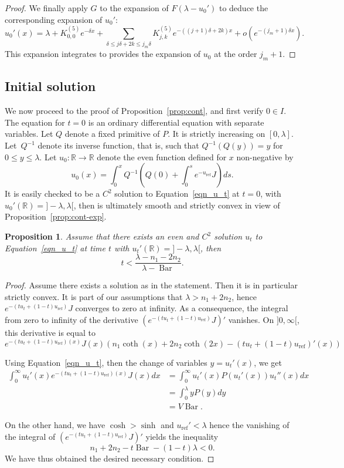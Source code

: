 \documentclass[JEP,XML,SOM,Unicode, NoEqCountersInSection, NoFloatCountersInSection]{cedram}
\theoremstyle{plain}
\newtheorem{prop}[thm]{Proposition}
\theoremstyle{definition}
\DeclareMathOperator{\barDH}{Bar}
\begin{document}
\begin{proof}
We finally apply $G$ to the expansion of $F(\lambda-u_0')$ to deduce the
corresponding expansion of $u_0'$:
\[ u_0'(x)=\lambda+ K_{0,0}^{(5)}e^{-\delta x} +
\sum_{\delta\leq j\delta+2k\leq j_m\delta}K_{j,k}^{(5)}e^{-((j+1)\delta+2k)x}
+o(e^{-(j_m+1)\delta x}). \]
This expansion integrates to provides the expansion of $u_0$ at the
order $j_m+1$.
\end{proof}

\subsection{Initial solution}

We now proceed to the proof of Proposition~\ref{prop:cont}, and first verify $0\in I$.
The equation for $t=0$ is an ordinary differential equation with separate variables.
Let $Q$ denote a fixed primitive of $P$.
It is strictly increasing on $[0,\lambda]$. Let~$Q^{-1}$ denote its inverse
function, that is, such that $Q^{-1}(Q(y))=y$
for $0\leq y \leq \lambda$.
Let $u_0:\mathbb{R}\to\mathbb{R}$ denote the even function defined
for $x$ non-negative by
\[ u_0(x)=\int_0^x Q^{-1}\left(Q(0)+\int_0^s e^{-u_{\mathrm{ref}}}J \right)ds. \]
It is easily checked to be a $C^2$ solution
to Equation~\eqref{eqn_u_t} at $t=0$,
with $u_0'(\mathbb{R})={}]-\lambda,\lambda[$,
then is ultimately smooth and strictly convex in view of Proposition~\ref{prop:cont-exp}.


\begin{prop}
Assume that there exists an even and $C^2$ solution $u_t$
to Equation~\eqref{eqn_u_t} at time $t$
with $u_t'(\mathbb{R})={}]-\lambda,\lambda[$, then
\[ t< \frac{\lambda-n_1-2n_2}{\lambda-\barDH}. \]
\end{prop}

\begin{proof}
Assume there exists a solution as in the statement. Then it is in particular
strictly convex.
It is part of our assumptions
that $\lambda>n_1+2n_2$, hence $e^{-(tu_t+(1-t)u_{\mathrm{ref}})}J$
converges to zero at infinity.
As a consequence, the integral from zero to infinity of the derivative
$(e^{-(tu_t+(1-t)u_{\mathrm{ref}})}J)'$
vanishes.
On $]0,\infty[$, this derivative is equal to
\[
e^{-(tu_t+(1-t)u_{\mathrm{ref}})(x)}J(x)\left(n_1\coth(x)+
2n_2\coth(2x)-(tu_t+(1-t)u_{\mathrm{ref}})'(x)\right) \]

Using Equation~\eqref{eqn_u_t}, then the change of variables $y=u_t'(x)$,
we get
\begin{align*}
\int_0^{\infty}u_t'(x)e^{-(tu_t+(1-t)u_{\mathrm{ref}})(x)}J(x)dx & =
\int_0^{\infty}u_t'(x)P(u_t'(x))u_t''(x)dx \\
& = \int_0^{\lambda}yP(y)dy \\
& = V \barDH.
\end{align*}

On the other hand, we have $\cosh>\sinh$ and $u_{\mathrm{ref}}'<\lambda$
hence the vanishing of the integral of $(e^{-(tu_t+(1-t)u_{\mathrm{ref}})}J)'$
yields the inequality
\[ n_1+2n_2-t\barDH-(1-t)\lambda<0. \]
We have thus obtained the desired necessary condition.
\end{proof}
\end{document}
